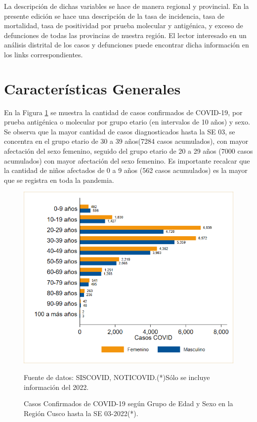 \documentclass[12pt,a4paper,openany]{book}
\begin{document}
	La descripción de dichas variables se hace de manera regional y provincial. En la presente edición se hace una descripción de la tasa de incidencia, tasa de mortalidad, tasa de positividad por prueba molecular y antigénica, y exceso de defunciones de todas las provincias de nuestra región. El lector interesado en un análisis distrital de los casos y defunciones puede encontrar dicha información en los links correspondientes.
	 
	
	\clearpage	
	\section*{Características Generales}
	
	
	
 	\noindent En la Figura \ref{fig:casos_edad_sexo} se muestra la cantidad de casos confirmados de COVID-19, por prueba antigénica o molecular por grupo etario (en intervalos de 10 años) y sexo. Se observa que la mayor cantidad de casos diagnosticados hasta la SE 03, se concentra en el grupo etario de 30 a 39 años(7284 casos acumulados), con mayor afectación del sexo femenino, seguido del grupo etario de 20 a 29 años (7000 casos acumulados) con mayor afectación del sexo femenino. Es importante recalcar que la cantidad de niños afectados de 0 a 9 años (562 casos acumulados) es la mayor que se registra en toda la pandemia. 
 	
 	
\begin{figure}[h]
	\caption{Casos Confirmados de COVID-19 según Grupo de Edad y Sexo en la Región Cusco hasta la SE 03-2022(*).}\label{fig:casos_edad_sexo}
	\begin{center}
		\includegraphics[width=0.75\linewidth]{../figuras/casos_etapavida_2022}
	\end{center}
	{\footnotesize {Fuente de datos: SISCOVID, NOTICOVID.(*)Sólo se incluye información del 2022.}}
\end{figure}
\pagebreak
\end{document}
